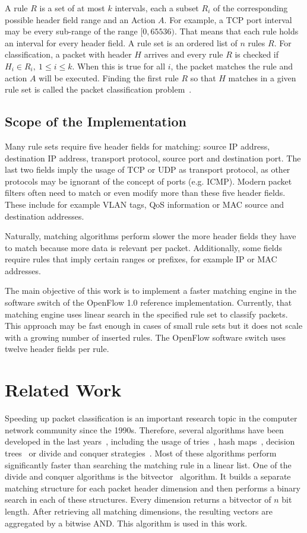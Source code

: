 \documentclass[conference]{IEEEtran}
\begin{document}
A rule $R$ is a set of at most $k$ intervals, each a subset $R_i$ of the 
corresponding possible header field range and an Action $A$.
For example, a TCP port interval may be every sub-range of the range $[0, 65536)$.
That means that each rule holds an interval for every header field.
A rule set is an ordered list of $n$ rules $R$.
For classification, a packet with header $H$ arrives and every rule $R$ is checked if
$H_i \in R_i,\ 1 \leq i \leq k$.
When this is true for all $i$, the packet matches the rule and action $A$ will be executed.
Finding the first rule $R$ so that $H$ matches in a given rule set is called 
the packet classification problem~\cite{taylor2005survey}.

\subsection{Scope of the Implementation}
Many rule sets require five header fields for matching: source 
IP address, destination IP address, transport protocol, source port and destination port.
The last two fields imply the usage of TCP or UDP as transport protocol, 
as other protocols may be ignorant of the concept of ports (e.g. ICMP).
Modern packet filters often need to match or even modify more than these five header fields.
These include for example VLAN tags, QoS information or MAC source and destination addresses.

Naturally, matching algorithms perform slower the more header fields they 
have to match because more data is relevant per packet.
Additionally, some fields require rules that imply certain ranges or prefixes, for example IP or MAC addresses.

The main objective of this work is to implement a faster matching engine in the 
software switch of the OpenFlow 1.0 reference implementation.
Currently, that matching engine uses linear search in the specified rule set to classify packets.
This approach may be fast enough in cases of small rule sets but it does not scale
with a growing number of inserted rules.
The OpenFlow software switch uses twelve header fields per rule.

\section{Related Work}
Speeding up packet classification is an important research topic in the computer network community since the 1990s.
Therefore, several algorithms have been developed in the last 
years~\cite{algorithms_survey}, including the usage of tries~\cite{tries}, 
hash maps~\cite{taylor2005survey}, decision trees~\cite{hicuts, efficuts, hypercuts} or divide 
and conquer strategies~\cite{bv}.
Most of these algorithms perform significantly faster than searching the 
matching rule in a linear list.
One of the divide and conquer algorithms is the bitvector~\cite{bv} algorithm.
It builds a separate matching structure for each packet header dimension 
and then performs a binary search in each of these structures.
Every dimension returns a bitvector of $n$ bit length.
After retrieving all matching dimensions, the resulting vectors are aggregated by a bitwise AND.
This algorithm is used in this work.
\end{document}
